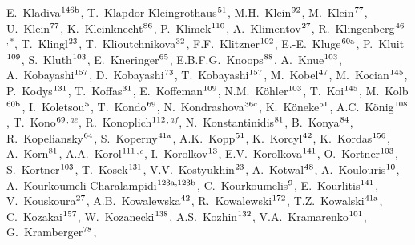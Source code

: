 \begin{flushleft}
E.~Kladiva$^\textrm{\scriptsize 146b}$,
T.~Klapdor-Kleingrothaus$^\textrm{\scriptsize 51}$,
M.H.~Klein$^\textrm{\scriptsize 92}$,
M.~Klein$^\textrm{\scriptsize 77}$,
U.~Klein$^\textrm{\scriptsize 77}$,
K.~Kleinknecht$^\textrm{\scriptsize 86}$,
P.~Klimek$^\textrm{\scriptsize 110}$,
A.~Klimentov$^\textrm{\scriptsize 27}$,
R.~Klingenberg$^\textrm{\scriptsize 46}$$^{,*}$,
T.~Klingl$^\textrm{\scriptsize 23}$,
T.~Klioutchnikova$^\textrm{\scriptsize 32}$,
F.F.~Klitzner$^\textrm{\scriptsize 102}$,
E.-E.~Kluge$^\textrm{\scriptsize 60a}$,
P.~Kluit$^\textrm{\scriptsize 109}$,
S.~Kluth$^\textrm{\scriptsize 103}$,
E.~Kneringer$^\textrm{\scriptsize 65}$,
E.B.F.G.~Knoops$^\textrm{\scriptsize 88}$,
A.~Knue$^\textrm{\scriptsize 103}$,
A.~Kobayashi$^\textrm{\scriptsize 157}$,
D.~Kobayashi$^\textrm{\scriptsize 73}$,
T.~Kobayashi$^\textrm{\scriptsize 157}$,
M.~Kobel$^\textrm{\scriptsize 47}$,
M.~Kocian$^\textrm{\scriptsize 145}$,
P.~Kodys$^\textrm{\scriptsize 131}$,
T.~Koffas$^\textrm{\scriptsize 31}$,
E.~Koffeman$^\textrm{\scriptsize 109}$,
N.M.~K\"ohler$^\textrm{\scriptsize 103}$,
T.~Koi$^\textrm{\scriptsize 145}$,
M.~Kolb$^\textrm{\scriptsize 60b}$,
I.~Koletsou$^\textrm{\scriptsize 5}$,
T.~Kondo$^\textrm{\scriptsize 69}$,
N.~Kondrashova$^\textrm{\scriptsize 36c}$,
K.~K\"oneke$^\textrm{\scriptsize 51}$,
A.C.~K\"onig$^\textrm{\scriptsize 108}$,
T.~Kono$^\textrm{\scriptsize 69}$$^{,ae}$,
R.~Konoplich$^\textrm{\scriptsize 112}$$^{,af}$,
N.~Konstantinidis$^\textrm{\scriptsize 81}$,
B.~Konya$^\textrm{\scriptsize 84}$,
R.~Kopeliansky$^\textrm{\scriptsize 64}$,
S.~Koperny$^\textrm{\scriptsize 41a}$,
A.K.~Kopp$^\textrm{\scriptsize 51}$,
K.~Korcyl$^\textrm{\scriptsize 42}$,
K.~Kordas$^\textrm{\scriptsize 156}$,
A.~Korn$^\textrm{\scriptsize 81}$,
A.A.~Korol$^\textrm{\scriptsize 111}$$^{,c}$,
I.~Korolkov$^\textrm{\scriptsize 13}$,
E.V.~Korolkova$^\textrm{\scriptsize 141}$,
O.~Kortner$^\textrm{\scriptsize 103}$,
S.~Kortner$^\textrm{\scriptsize 103}$,
T.~Kosek$^\textrm{\scriptsize 131}$,
V.V.~Kostyukhin$^\textrm{\scriptsize 23}$,
A.~Kotwal$^\textrm{\scriptsize 48}$,
A.~Koulouris$^\textrm{\scriptsize 10}$,
A.~Kourkoumeli-Charalampidi$^\textrm{\scriptsize 123a,123b}$,
C.~Kourkoumelis$^\textrm{\scriptsize 9}$,
E.~Kourlitis$^\textrm{\scriptsize 141}$,
V.~Kouskoura$^\textrm{\scriptsize 27}$,
A.B.~Kowalewska$^\textrm{\scriptsize 42}$,
R.~Kowalewski$^\textrm{\scriptsize 172}$,
T.Z.~Kowalski$^\textrm{\scriptsize 41a}$,
C.~Kozakai$^\textrm{\scriptsize 157}$,
W.~Kozanecki$^\textrm{\scriptsize 138}$,
A.S.~Kozhin$^\textrm{\scriptsize 132}$,
V.A.~Kramarenko$^\textrm{\scriptsize 101}$,
G.~Kramberger$^\textrm{\scriptsize 78}$,

\end{flushleft}
